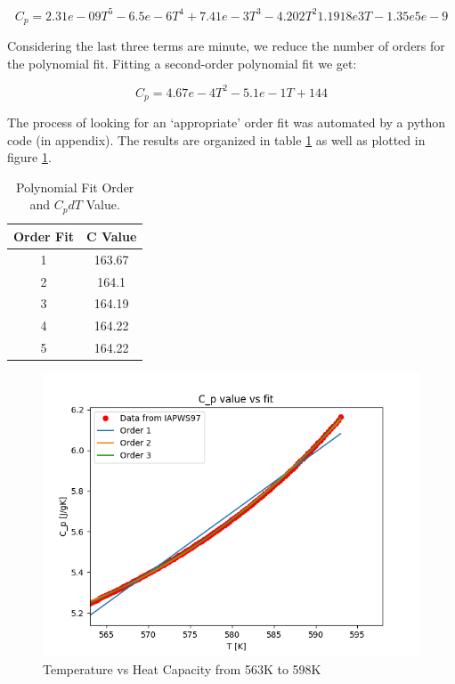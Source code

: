 \documentclass[12pt,letterpaper]{article}
\begin{document}
\[C_p = 2.31e-09 T^5 -6.5e-6 T^4 +7.41e-3 T^3 -4.202 T^2 1.1918e3 T -1.35e5e-9\]

Considering the last three terms are minute, we reduce the 
number of orders for the polynomial fit. Fitting a second-order
polynomial fit we get:

\[C_p = 4.67e-4T^2 -5.1e-1T + 144\]

The process of looking for an `appropriate' order fit was automated
by a python code (in appendix). The results are organized in table \ref{tab:poly_fit} as well as plotted in figure \ref{fig:poly_fit}.


\begin{table}[h]
     \centering
    \begin{tabular}{cc}
       \hline
       Order Fit & C Value  \\
       \hline
       1 & 163.67 \\
       2 & 164.1 \\
       3 & 164.19 \\
       4 & 164.22 \\
       5 & 164.22 \\
       \hline
    \end{tabular}
    \caption {Polynomial Fit Order and $C_p dT$ Value.}
    \label{tab:poly_fit}
\end{table}


\begin{figure}[htbp!]
    \begin{center}
        \includegraphics[scale=0.7]{cp_plot.png}
    \end{center}
    \caption{Temperature vs Heat Capacity from 563K to 598K}
    \label{fig:poly_fit}
\end{figure}
\end{document}
